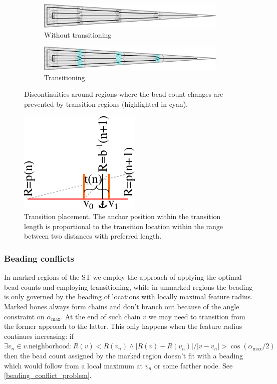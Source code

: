 \begin{figure}
\centering
\setlength{\figwidth}{\columnwidth}
\begin{subfigure}{0.9\figwidth}
\includegraphics[width=\columnwidth]{sources/method/wedge_distributed_generated__no_transitions.pdf}
\caption{Without transitioning}
\end{subfigure}
\begin{subfigure}{0.9\figwidth}
\includegraphics[width=\columnwidth]{sources/method/wedge_distributed_generated.pdf}
\caption{Transitioning}
\end{subfigure}
\caption{
Discontinuities around regions where the bead count changes are prevented by transition regions (highlighted in cyan).
}
\label{transitions}
\end{figure}


\begin{figure}
\centering
\includegraphics[width=.3\columnwidth]{sources/method/transition_location_precise.pdf}
\caption{
Transition placement.
The anchor position within the transition length is proportional to the transition location within the range between two distances with preferred length. 
}
\label{transition_placement}
\end{figure}




\subsubsection{Beading conflicts}\label{section_beading_conflicts}
In marked regions of the ST we employ the approach of applying the optimal bead counts and employing transitioning, while in unmarked regions the beading is only governed by the beading of locations with locally maximal feature radius.
Marked bones always form chains and don't branch out because of the angle constraint on $\alpha_\text{max}$. 
At the end of such chain $v$ we may need to transition from the former approach to the latter.
This only happens when the feature radius continues increasing: if $\exists v_n \in v.\text{neighborhood}: R(v) < R(v_n) \land | R(v) - R(v_n) | / |v - v_n| >  \cos(\alpha_\text{max} / 2)$ then the bead count assigned by the marked region doesn't fit with a beading which would follow from a local maximum at $v_n$ or some farther node.
See \cref{beading_conflict_problem}.


